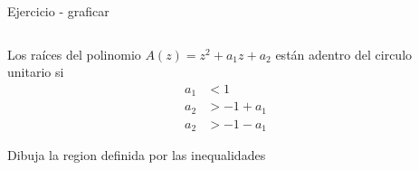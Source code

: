 \documentclass[presentation,aspectratio=169]{beamer}
\begin{document}
\begin{frame}[label={sec:orgb337b19}]{Ejercicio - graficar}
\begin{columns}
\begin{column}{0.5\columnwidth}
Los raíces del polinomio \(A(z) = z^2 + a_1z + a_2\) están adentro del circulo unitario si
\begin{align*}
a_1 &< 1\\
a_2 &> -1+a_1\\
a_2 &> -1 - a_1
\end{align*}

\alert{Dibuja la region definida por las inequalidades}
\end{column}
\begin{column}{0.5\columnwidth}
\begin{center}
\end{center}
\end{column}
\end{columns}
\end{frame}
\end{document}

